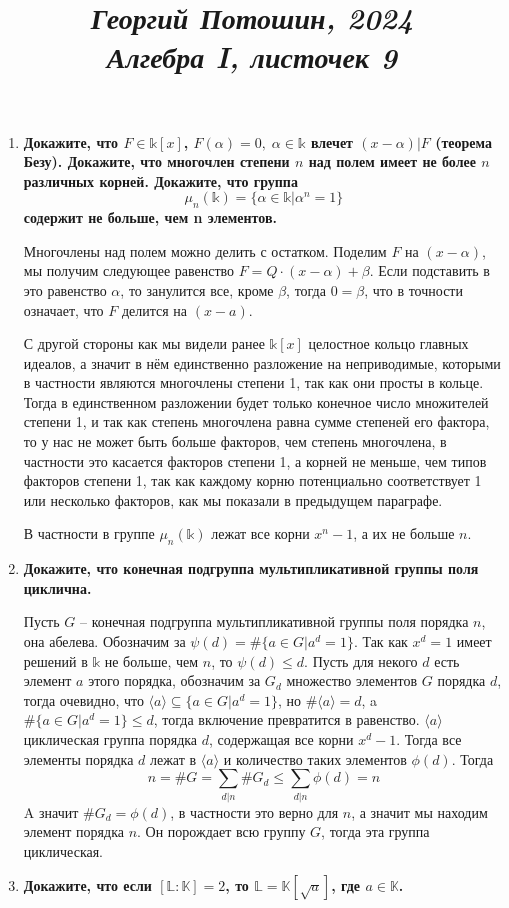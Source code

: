 \documentclass{article}
\title{
\textit{\small{Георгий Потошин, 2024}}\\
\vspace{0.3ex}
\textit{\huge{Алгебра I, листочек 9}}\vspace{1ex}
}
\date{\vspace{-10ex}}
\begin{document}
\maketitle

\begin{enumerate}
    \item \textbf{Докажите, что $F\in\mathbb{k}[x]$, $F(\alpha)=0,\;\alpha\in\mathbb{k}$ влечет
        $(x−\alpha)|F$ (теорема Безу). Докажите, что многочлен степени $n$ над полем имеет не
        более $n$ различных корней. Докажите, что группа
        \[\mu_n(\mathbb{k})=\{\alpha\in\mathbb{k}|\alpha^n=1\}\]
        содержит не больше, чем n элементов.}

        Многочлены над полем можно делить с остатком. Поделим $F$ на $(x-\alpha)$,
        мы получим следующее равенство $F=Q\cdot(x-\alpha)+\beta$. Если подставить
        в это равенство $\alpha$, то занулится все, кроме $\beta$, тогда $0=\beta$,
        что в точности означает, что $F$ делится на $(x-a)$.

        С другой стороны как мы видели ранее $\mathbb{k}[x]$ целостное кольцо
        главных идеалов, а значит в нём единственно разложение на неприводимые, которыми
        в частности являются многочлены степени 1, так как они просты в кольце.
        Тогда в единственном разложении будет только конечное число множителей
        степени 1, и так как степень многочлена равна сумме степеней его фактора,
        то у нас не может быть больше факторов, чем степень многочлена, в частности
        это касается факторов степени 1, а корней не меньше, чем типов факторов
        степени 1, так как каждому корню потенциально соответствует 1 или несколько
        факторов, как мы показали в предыдущем параграфе.
        
        В частности в группе $\mu_n(\mathbb{k})$ лежат все корни $x^n-1$, а их
        не больше $n$.

    \item \textbf{Докажите, что конечная подгруппа мультипликативной группы поля циклична.}

        Пусть $G$ – конечная подгруппа мультипликативной группы поля порядка $n$, она абелева. Обозначим за
        $\psi(d) = \#\{a\in G | a^d = 1\}$. Так как $x^d=1$ имеет решений в $\mathbb{k}$
        не больше, чем $n$, то $\psi(d)\leq d$. Пусть для некого $d$ есть элемент $a$ этого
        порядка, обозначим за $G_d$ множество элементов $G$ порядка $d$, тогда очевидно, что
        $\langle a\rangle\subseteq\{a\in G | a^d=1\}$, но $\#\langle a\rangle = d$,
        a $\#\{a\in G | a^d = 1\}\leq d$, тогда включение превратится в равенство.
        $\langle a\rangle$ циклическая группа порядка $d$, содержащая все корни
        $x^d-1$. Тогда все элементы порядка $d$ лежат в $\langle a\rangle$ и количество
        таких элементов $\phi(d)$. Тогда
        \[n=\#G=\sum_{d|n}\#G_d\leq\sum_{d|n}\phi(d)=n\]
        A значит $\#G_d=\phi(d)$, в частности это верно для $n$, а значит мы находим элемент порядка $n$.
        Он порождает всю группу $G$, тогда эта группа циклическая.
        
    \item \textbf{Докажите, что если $[\mathbb{L}:\mathbb{K}]=2$, то $\mathbb{L}=\mathbb{K}[\sqrt a]$, где
        $a\in\mathbb{K}$.} 
\end{enumerate}
\end{document}
